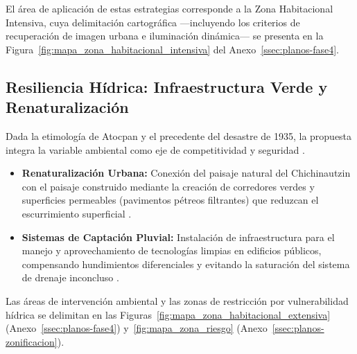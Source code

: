 El área de aplicación de estas estrategias corresponde a la Zona Habitacional Intensiva,
cuya delimitación cartográfica —incluyendo los criterios de recuperación de imagen
urbana e iluminación dinámica— se presenta en la
Figura~\ref{fig:mapa_zona_habitacional_intensiva} del Anexo~\ref{ssec:planos-fase4}.

\subsection{Resiliencia Hídrica: Infraestructura Verde y Renaturalización}
\label{ssec:resilencia-infraestructura}

Dada la etimología de Atocpan y el precedente del desastre de 1935, la 
propuesta integra la variable ambiental como eje de competitividad y 
seguridad \cite{balandrano2016conservacion}.

\begin{itemize}
    \item \textbf{Renaturalización Urbana:} Conexión del paisaje natural del 
            Chichinautzin con el paisaje construido mediante la creación de 
            corredores verdes y superficies permeables 
            (pavimentos pétreos filtrantes) que reduzcan el 
            escurrimiento superficial \cite{balandrano2016conservacion, rodriguez2009tesis}.
    \item \textbf{Sistemas de Captación Pluvial:} Instalación de infraestructura
            para el manejo y aprovechamiento de tecnologías limpias en
            edificios públicos, compensando hundimientos diferenciales y
            evitando la saturación del sistema de
            drenaje inconcluso \cite{balandrano2016conservacion}.
\end{itemize}

Las áreas de intervención ambiental y las zonas de restricción por vulnerabilidad
hídrica se delimitan en las Figuras~\ref{fig:mapa_zona_habitacional_extensiva}
(Anexo~\ref{ssec:planos-fase4}) y~\ref{fig:mapa_zona_riesgo}
(Anexo~\ref{ssec:planos-zonificacion}).